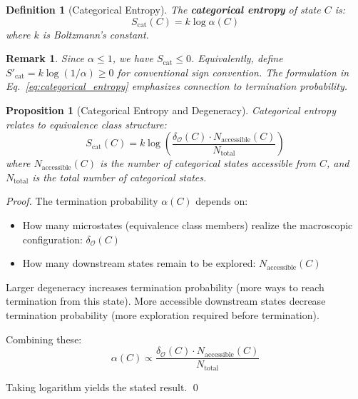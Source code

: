 \documentclass[12pt,a4paper]{article}
\newtheorem{definition}{Definition}
\newtheorem{proposition}{Proposition}
\newtheorem{remark}{Remark}
\begin{document}
\begin{definition}[Categorical Entropy]
\label{def:categorical_entropy}
The \textbf{categorical entropy} of state $C$ is:
\begin{equation}
S_{\text{cat}}(C) = k \log \alpha(C)
\label{eq:categorical_entropy}
\end{equation}
where $k$ is Boltzmann's constant.
\end{definition}

\begin{remark}
Since $\alpha \leq 1$, we have $S_{\text{cat}} \leq 0$. Equivalently, define $S'_{\text{cat}} = k \log(1/\alpha) \geq 0$ for conventional sign convention. The formulation in Eq.~\eqref{eq:categorical_entropy} emphasizes connection to termination probability.
\end{remark}

\begin{proposition}[Categorical Entropy and Degeneracy]
\label{prop:entropy_degeneracy}
Categorical entropy relates to equivalence class structure:
\begin{equation}
S_{\text{cat}}(C) = k \log \left( \frac{\delta_{\mathcal{O}}(C) \cdot N_{\text{accessible}}(C)}{N_{\text{total}}} \right)
\end{equation}
where $N_{\text{accessible}}(C)$ is the number of categorical states accessible from $C$, and $N_{\text{total}}$ is the total number of categorical states.
\end{proposition}

\begin{proof}
The termination probability $\alpha(C)$ depends on:
\begin{itemize}
\item How many microstates (equivalence class members) realize the macroscopic configuration: $\delta_{\mathcal{O}}(C)$
\item How many downstream states remain to be explored: $N_{\text{accessible}}(C)$
\end{itemize}

Larger degeneracy increases termination probability (more ways to reach termination from this state). More accessible downstream states decrease termination probability (more exploration required before termination).

Combining these:
\begin{equation}
\alpha(C) \propto \frac{\delta_{\mathcal{O}}(C) \cdot N_{\text{accessible}}(C)}{N_{\text{total}}}
\end{equation}

Taking logarithm yields the stated result. \qed
\end{proof}
\end{document}
